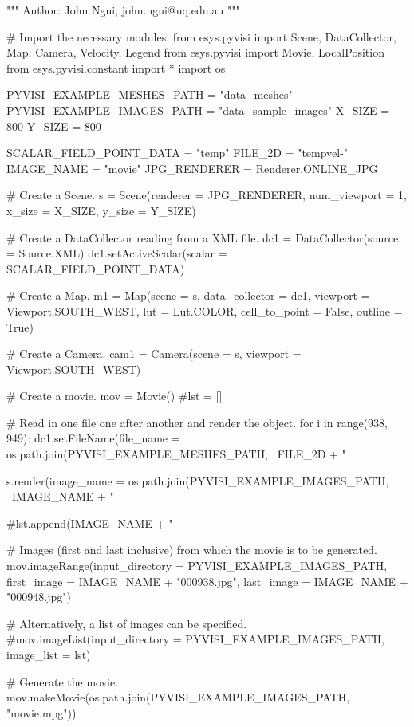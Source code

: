 \begin{python}
"""
Author: John Ngui, john.ngui@uq.edu.au
"""

# Import the necessary modules.
from esys.pyvisi import Scene, DataCollector, Map, Camera, Velocity, Legend 
from esys.pyvisi import Movie, LocalPosition
from esys.pyvisi.constant import *
import os

PYVISI_EXAMPLE_MESHES_PATH = "data_meshes"
PYVISI_EXAMPLE_IMAGES_PATH = "data_sample_images"
X_SIZE = 800
Y_SIZE = 800

SCALAR_FIELD_POINT_DATA = "temp"
FILE_2D = "tempvel-"
IMAGE_NAME = "movie"
JPG_RENDERER = Renderer.ONLINE_JPG

# Create a Scene.
s = Scene(renderer = JPG_RENDERER, num_viewport = 1, x_size = X_SIZE, 
        y_size = Y_SIZE)

# Create a DataCollector reading from a XML file. 
dc1 = DataCollector(source = Source.XML)
dc1.setActiveScalar(scalar = SCALAR_FIELD_POINT_DATA)

# Create a Map.
m1 = Map(scene = s, data_collector = dc1, 
        viewport = Viewport.SOUTH_WEST, lut = Lut.COLOR, cell_to_point = False,
        outline = True)

# Create a Camera.
cam1 = Camera(scene = s, viewport = Viewport.SOUTH_WEST)

# Create a movie.
mov = Movie()
#lst = []

# Read in one file one after another and render the object. 
for i in range(938, 949):
    dc1.setFileName(file_name =  os.path.join(PYVISI_EXAMPLE_MESHES_PATH, \
	        FILE_2D + "%

    s.render(image_name = os.path.join(PYVISI_EXAMPLE_IMAGES_PATH, \
            IMAGE_NAME + "%

    #lst.append(IMAGE_NAME + "%

# Images (first and last inclusive) from which the movie is to be generated.
mov.imageRange(input_directory = PYVISI_EXAMPLE_IMAGES_PATH, 
        first_image = IMAGE_NAME + "000938.jpg", 
        last_image = IMAGE_NAME + "000948.jpg")

# Alternatively, a list of images can be specified.
#mov.imageList(input_directory = PYVISI_EXAMPLE_IMAGES_PATH, image_list = lst)

# Generate the movie.
mov.makeMovie(os.path.join(PYVISI_EXAMPLE_IMAGES_PATH, "movie.mpg"))
\end{python}




